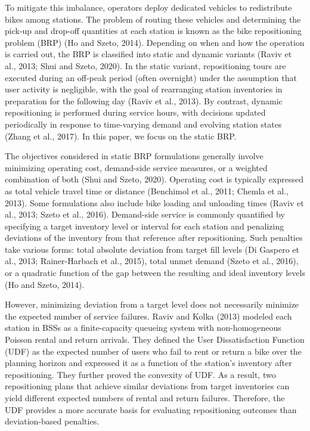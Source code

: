 \documentclass[11pt]{article}
\numberwithin{table}{section}
\numberwithin{figure}{section}
\begin{document}
To mitigate this imbalance, operators deploy dedicated vehicles to redistribute bikes among stations. The problem of routing these vehicles and determining the pick-up and drop-off quantities at each station is known as the bike repositioning problem (BRP) (Ho and Szeto, 2014). Depending on when and how the operation is carried out, the BRP is classified into static and dynamic variants (Raviv et al., 2013; Shui and Szeto, 2020). In the static variant, repositioning tours are executed during an off-peak period (often overnight) under the assumption that user activity is negligible, with the goal of rearranging station inventories in preparation for the following day (Raviv et al., 2013). By contrast, dynamic repositioning is performed during service hours, with decisions updated periodically in response to time-varying demand and evolving station states (Zhang et al., 2017). In this paper, we focus on the static BRP.

The objectives considered in static BRP formulations generally involve minimizing operating cost, demand-side service measures, or a weighted combination of both (Shui and Szeto, 2020). Operating cost is typically expressed as total vehicle travel time or distance (Benchimol et al., 2011; Chemla et al., 2013). Some formulations also include bike loading and unloading times (Raviv et al., 2013; Szeto et al., 2016). Demand-side service is commonly quantified by specifying a target inventory level or interval for each station and penalizing deviations of the inventory from that reference after repositioning. Such penalties take various forms: total absolute deviation from target fill levels (Di Gaspero et al., 2013; Rainer-Harbach et al., 2015), total unmet demand (Szeto et al., 2016), or a quadratic function of the gap between the resulting and ideal inventory levels (Ho and Szeto, 2014).

However, minimizing deviation from a target level does not necessarily minimize the expected number of service failures. Raviv and Kolka (2013) modeled each station in BSSs as a finite-capacity queueing system with non-homogeneous Poisson rental and return arrivals. They defined the User Dissatisfaction Function (UDF) as the expected number of users who fail to rent or return a bike over the planning horizon and expressed it as a function of the station’s inventory after repositioning. They further proved the convexity of UDF. As a result, two repositioning plans that achieve similar deviations from target inventories can yield different expected numbers of rental and return failures. Therefore, the UDF provides a more accurate basis for evaluating repositioning outcomes than deviation-based penalties.
\end{document}
